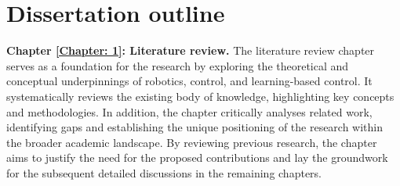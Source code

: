 \section{Dissertation outline }
\textbf{Chapter \textcolor{red}{\ref{Chapter: 1}}: Literature review.} The literature review chapter serves as a foundation for the research by exploring the theoretical and conceptual underpinnings of robotics, control, and learning-based control. It systematically reviews the existing body of knowledge, highlighting key concepts and methodologies. In addition, the chapter critically analyses related work, identifying gaps and establishing the unique positioning of the research within the broader academic landscape. By reviewing previous research, the chapter aims to justify the need for the proposed contributions and lay the groundwork for the subsequent detailed discussions in the remaining chapters.

